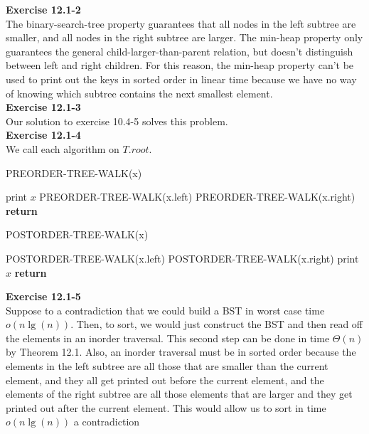 \documentclass{article}
\begin{document}
\noindent\textbf{Exercise 12.1-2}\\

The binary-search-tree property guarantees that all nodes in the left subtree are smaller, and all nodes in the right subtree are larger. The min-heap property only guarantees the general child-larger-than-parent relation, but doesn't distinguish between left and right children.  For this reason, the min-heap property can't be used to print out the keys in sorted order in linear time because we have no way of knowing which subtree contains the next smallest element. \\

\noindent\textbf{ Exercise 12.1-3} \\

Our solution to exercise 10.4-5 solves this problem.\\

\noindent\textbf{Exercise 12.1-4}\\
We call each algorithm on $T.root$. 
\begin{algorithm}
\caption{PREORDER-TREE-WALK(x)}
\begin{algorithmic}
	\State print $x$
	\State PREORDER-TREE-WALK(x.left)
	\State PREORDER-TREE-WALK(x.right)
\EndIf
\State \textbf{return}
\end{algorithmic}
\end{algorithm}

\begin{algorithm}
\caption{POSTORDER-TREE-WALK(x)}
\begin{algorithmic}
	\State POSTORDER-TREE-WALK(x.left)
	\State POSTORDER-TREE-WALK(x.right)
	\State print $x$
\EndIf
\State \textbf{return}
\end{algorithmic}
\end{algorithm}


\noindent\textbf{ Exercise 12.1-5} \\

Suppose to a contradiction that we could build a BST in worst case time $o(n\lg(n))$. Then, to sort, we would just construct the BST and then read off the elements in an inorder traversal. This second step can be done in time $\Theta(n)$ by Theorem 12.1. Also, an inorder traversal must be in sorted order because the elements in the left subtree are all those that are smaller than the current element, and they all get printed out before the current element, and the elements of the right subtree are all those elements that are larger and they get printed out  after the current element. This would allow us to sort in time $o(n\lg(n))$ a contradiction\\
\end{document}
